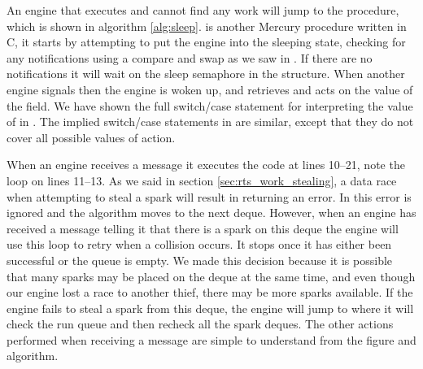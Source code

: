 
An engine that executes \idle and cannot find any work will jump to the
\sleep procedure,
which is shown in algorithm \ref{alg:sleep}.
\sleep is another Mercury procedure written in C,
it starts by attempting to put the engine into the sleeping state,
checking for any notifications using a compare and swap as we saw in \idle.
If there are no notifications it will wait on the sleep semaphore in the
\enginesleepsync structure.
When another engine signals  then the engine is woken up,
and retrieves and acts on the value of the  field.
We have shown the full switch/case statement for interpreting the value of
 in \sleep.
The implied switch/case statements in \idle are similar,
except that they do not cover all possible values of action.

When an engine receives a  message it executes the
code at lines 10--21,
note the loop on lines 11--13.
As we said in section \ref{sec:rts_work_stealing},
a data race when attempting to steal a spark will result in
\steal returning an error.
In \trystealspark this error is ignored and the algorithm moves to the next
deque.
However,
when an engine has received a message telling it that there is a spark on
this deque the engine will use this loop to retry when a collision occurs.
It stops once it has either been successful or the queue is empty.
We made this decision because it is possible that many sparks may be placed
on the deque at the same time,
and even though our engine lost a race to another thief, there may be more
sparks available.
If the engine fails to steal a spark from this deque,
the engine will jump to \idle where it will check the run queue and then
recheck all the spark deques.
The other actions performed when receiving a message are simple to
understand from the figure and algorithm.

